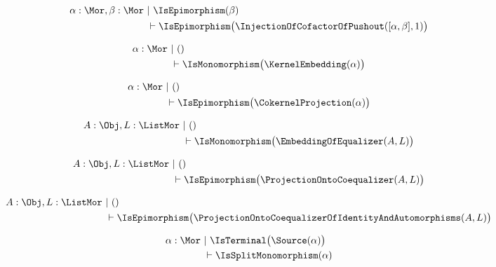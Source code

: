 \begin{sequent}
\begin{align*}
  \alpha:\Mor, \beta:\Mor  ~&|~ \IsEpimorphism( \beta ) \\
  &\vdash \IsEpimorphism\big( \InjectionOfCofactorOfPushout( [\alpha, \beta], 1 ) \big)
\end{align*}
\end{sequent}

\begin{sequent}
\begin{align*}
  \alpha:\Mor ~&|~ () \\
  &\vdash \IsMonomorphism\big( \KernelEmbedding( \alpha ) \big)
\end{align*}
\end{sequent}

\begin{sequent}
\begin{align*}
  \alpha:\Mor ~&|~ () \\
  &\vdash \IsEpimorphism\big( \CokernelProjection( \alpha ) \big)
\end{align*}
\end{sequent}

\begin{sequent}
\begin{align*}
  A:\Obj, L:\ListMor ~&|~ () \\
  &\vdash \IsMonomorphism\big( \EmbeddingOfEqualizer( A, L ) \big)
\end{align*}
\end{sequent}

\begin{sequent}
\begin{align*}
  A:\Obj, L:\ListMor ~&|~ () \\
  &\vdash \IsEpimorphism\big( \ProjectionOntoCoequalizer( A, L ) \big)
\end{align*}
\end{sequent}

\begin{sequent}
\begin{align*}
  A:\Obj, L:\ListMor ~&|~ () \\
  &\vdash \IsEpimorphism\big( \ProjectionOntoCoequalizerOfIdentityAndAutomorphisms( A, L ) \big)
\end{align*}
\end{sequent}

\begin{sequent}\label{sequent:no_proper_context_7}
\begin{align*}
  \alpha:\Mor ~&|~ \IsTerminal\big( \Source( \alpha ) \big)\\
  &\vdash \IsSplitMonomorphism( \alpha )
\end{align*}
\end{sequent}

